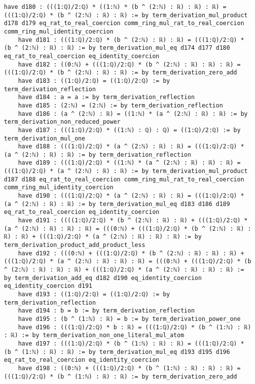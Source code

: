 \documentclass{article}
\begin{document}
\begin{tcolorbox}[colback=white!10, width=\linewidth]
\begin{lstlisting}[language=Lean4]
    have d180 : (((1:ℚ)/2:ℚ) * ((1:ℕ) * (b ^ (2:ℕ) : ℝ) : ℝ) : ℝ) = (((1:ℚ)/2:ℚ) * (b ^ (2:ℕ) : ℝ) : ℝ) := by term_derivation_mul_product d178 d179 eq_rat_to_real_coercion comm_ring_mul_rat_to_real_coercion comm_ring_mul_identity_coercion
    have d181 : (((1:ℚ)/2:ℚ) * (b ^ (2:ℕ) : ℝ) : ℝ) = (((1:ℚ)/2:ℚ) * (b ^ (2:ℕ) : ℝ) : ℝ) := by term_derivation_mul_eq d174 d177 d180 eq_rat_to_real_coercion eq_identity_coercion
    have d182 : ((0:ℕ) + (((1:ℚ)/2:ℚ) * (b ^ (2:ℕ) : ℝ) : ℝ) : ℝ) = (((1:ℚ)/2:ℚ) * (b ^ (2:ℕ) : ℝ) : ℝ) := by term_derivation_zero_add
    have d183 : ((1:ℚ)/2:ℚ) = ((1:ℚ)/2:ℚ) := by term_derivation_reflection
    have d184 : a = a := by term_derivation_reflection
    have d185 : (2:ℕ) = (2:ℕ) := by term_derivation_reflection
    have d186 : (a ^ (2:ℕ) : ℝ) = ((1:ℕ) * (a ^ (2:ℕ) : ℝ) : ℝ) := by term_derivation_non_reduced_power
    have d187 : (((1:ℚ)/2:ℚ) * ((1:ℕ) : ℚ) : ℚ) = ((1:ℚ)/2:ℚ) := by term_derivation_mul_one
    have d188 : (((1:ℚ)/2:ℚ) * (a ^ (2:ℕ) : ℝ) : ℝ) = (((1:ℚ)/2:ℚ) * (a ^ (2:ℕ) : ℝ) : ℝ) := by term_derivation_reflection
    have d189 : (((1:ℚ)/2:ℚ) * ((1:ℕ) * (a ^ (2:ℕ) : ℝ) : ℝ) : ℝ) = (((1:ℚ)/2:ℚ) * (a ^ (2:ℕ) : ℝ) : ℝ) := by term_derivation_mul_product d187 d188 eq_rat_to_real_coercion comm_ring_mul_rat_to_real_coercion comm_ring_mul_identity_coercion
    have d190 : (((1:ℚ)/2:ℚ) * (a ^ (2:ℕ) : ℝ) : ℝ) = (((1:ℚ)/2:ℚ) * (a ^ (2:ℕ) : ℝ) : ℝ) := by term_derivation_mul_eq d183 d186 d189 eq_rat_to_real_coercion eq_identity_coercion
    have d191 : ((((1:ℚ)/2:ℚ) * (b ^ (2:ℕ) : ℝ) : ℝ) + (((1:ℚ)/2:ℚ) * (a ^ (2:ℕ) : ℝ) : ℝ) : ℝ) = (((0:ℕ) + (((1:ℚ)/2:ℚ) * (b ^ (2:ℕ) : ℝ) : ℝ) : ℝ) + (((1:ℚ)/2:ℚ) * (a ^ (2:ℕ) : ℝ) : ℝ) : ℝ) := by term_derivation_product_add_product_less
    have d192 : (((0:ℕ) + (((1:ℚ)/2:ℚ) * (b ^ (2:ℕ) : ℝ) : ℝ) : ℝ) + (((1:ℚ)/2:ℚ) * (a ^ (2:ℕ) : ℝ) : ℝ) : ℝ) = (((0:ℕ) + (((1:ℚ)/2:ℚ) * (b ^ (2:ℕ) : ℝ) : ℝ) : ℝ) + (((1:ℚ)/2:ℚ) * (a ^ (2:ℕ) : ℝ) : ℝ) : ℝ) := by term_derivation_add_eq d182 d190 eq_identity_coercion eq_identity_coercion d191
    have d193 : ((1:ℚ)/2:ℚ) = ((1:ℚ)/2:ℚ) := by term_derivation_reflection
    have d194 : b = b := by term_derivation_reflection
    have d195 : (b ^ (1:ℕ) : ℝ) = b := by term_derivation_power_one
    have d196 : (((1:ℚ)/2:ℚ) * b : ℝ) = (((1:ℚ)/2:ℚ) * (b ^ (1:ℕ) : ℝ) : ℝ) := by term_derivation_non_one_literal_mul_atom
    have d197 : (((1:ℚ)/2:ℚ) * (b ^ (1:ℕ) : ℝ) : ℝ) = (((1:ℚ)/2:ℚ) * (b ^ (1:ℕ) : ℝ) : ℝ) := by term_derivation_mul_eq d193 d195 d196 eq_rat_to_real_coercion eq_identity_coercion
    have d198 : ((0:ℕ) + (((1:ℚ)/2:ℚ) * (b ^ (1:ℕ) : ℝ) : ℝ) : ℝ) = (((1:ℚ)/2:ℚ) * (b ^ (1:ℕ) : ℝ) : ℝ) := by term_derivation_zero_add

\end{lstlisting}
\end{tcolorbox}
\end{document}
